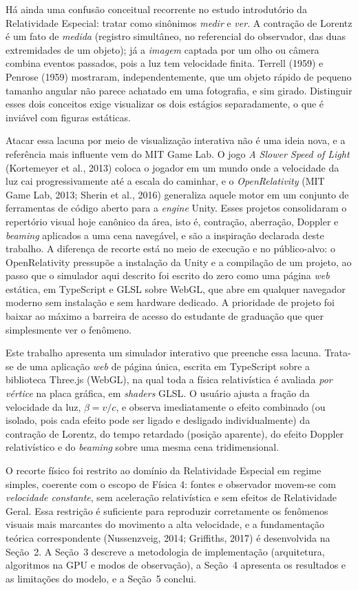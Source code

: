 \documentclass[10pt,a4paper,twocolumn]{article}
\begin{document}
Há ainda uma confusão conceitual recorrente no estudo introdutório da Relatividade
Especial: tratar como sinônimos \emph{medir} e \emph{ver}. A contração de Lorentz é um fato
de \emph{medida} (registro simultâneo, no referencial do observador, das duas extremidades
de um objeto); já a \emph{imagem} captada por um olho ou câmera combina eventos
passados, pois a luz tem velocidade finita. Terrell (1959) e Penrose (1959) mostraram,
independentemente, que um objeto rápido de pequeno tamanho angular não parece achatado em
uma fotografia, e sim girado. Distinguir esses dois conceitos exige visualizar os
dois estágios separadamente, o que é inviável com figuras estáticas.

Atacar essa lacuna por meio de visualização interativa não é uma ideia nova, e a
referência mais influente vem do MIT Game Lab. O jogo \emph{A Slower Speed of Light}
(Kortemeyer et al., 2013) coloca o jogador em um mundo onde a velocidade da luz cai
progressivamente até a escala do caminhar, e o \emph{OpenRelativity} (MIT Game Lab, 2013;
Sherin et al., 2016) generaliza aquele motor em um conjunto de ferramentas de código
aberto para a \emph{engine} Unity. Esses projetos consolidaram o repertório visual hoje
canônico da área, isto é, contração, aberração, Doppler e \emph{beaming} aplicados a uma
cena navegável, e são a inspiração declarada deste trabalho. A diferença de recorte está
no meio de execução e no público-alvo: o OpenRelativity pressupõe a instalação da Unity e
a compilação de um projeto, ao passo que o simulador aqui descrito foi escrito do zero
como uma página \emph{web} estática, em TypeScript e GLSL sobre WebGL, que abre em
qualquer navegador moderno sem instalação e sem hardware dedicado. A prioridade de projeto
foi baixar ao máximo a barreira de acesso do estudante de graduação que quer simplesmente
ver o fenômeno.

Este trabalho apresenta um simulador interativo que preenche essa lacuna. Trata-se de uma
aplicação \emph{web} de página única, escrita em TypeScript sobre a biblioteca Three.js
(WebGL), na qual toda a física relativística é avaliada \emph{por vértice} na placa gráfica,
em \emph{shaders} GLSL. O usuário ajusta a fração da velocidade da luz,
$\beta = v/c$, e observa imediatamente o efeito combinado (ou isolado, pois cada efeito
pode ser ligado e desligado individualmente) da contração de Lorentz, do tempo retardado
(posição aparente), do efeito Doppler relativístico e do \emph{beaming} sobre uma mesma
cena tridimensional.

O recorte físico foi restrito ao domínio da Relatividade Especial em regime
simples, coerente com o escopo de Física 4: fontes e observador movem-se com
\emph{velocidade constante}, sem aceleração relativística e sem efeitos de Relatividade
Geral. Essa restrição é suficiente para reproduzir corretamente os fenômenos visuais mais
marcantes do movimento a alta velocidade, e a fundamentação teórica correspondente
(Nussenzveig, 2014; Griffiths, 2017) é desenvolvida na Seção~2. A Seção~3 descreve a
metodologia de implementação (arquitetura, algoritmos na GPU e modos de observação), a
Seção~4 apresenta os resultados e as limitações do modelo, e a Seção~5 conclui.
\end{document}
